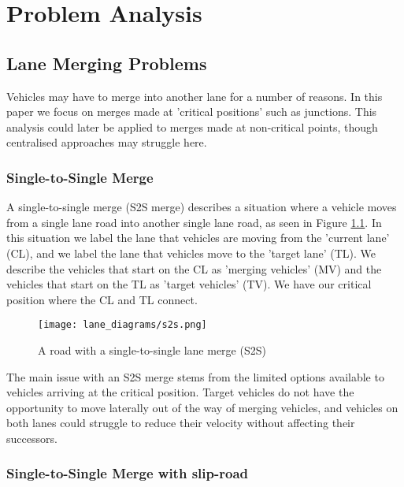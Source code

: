 \chapter{Problem Analysis}
\label{cha:Problem Analysis}

\section{Lane Merging Problems}
\label{sec:Lane Merging Problems}
Vehicles may have to merge into another lane for a number of reasons. In this paper we focus on merges made at 'critical positions' such as junctions. This analysis could later be applied to merges made at non-critical points, though centralised approaches may struggle here.

\subsection{Single-to-Single Merge}
\label{subsec:Single-to-Single Merge}
A single-to-single merge (S2S merge) describes a situation where a vehicle moves from a single lane road into another single lane road, as seen in Figure \ref{fig:S2SMerge}. In this situation we label the lane that vehicles are moving from the 'current lane' (CL), and we label the lane that vehicles move to the 'target lane' (TL). We describe the vehicles that start on the CL as 'merging vehicles' (MV) and the vehicles that start on the TL as 'target vehicles' (TV). We have our critical position where the CL and TL connect.

\begin{figure}[htb]
\texttt{[image: lane\_diagrams/s2s.png]}
\caption{A road with a single-to-single lane merge (S2S)}
\label{fig:S2SMerge}
\end{figure}

The main issue with an S2S merge stems from the limited options available to vehicles arriving at the critical position. Target vehicles do not have the opportunity to move laterally out of the way of merging vehicles, and vehicles on both lanes could struggle to reduce their velocity without affecting their successors.

\subsection{Single-to-Single Merge with slip-road}
\label{subsec:Single-to-Single Merge with slip-road}{}{}

